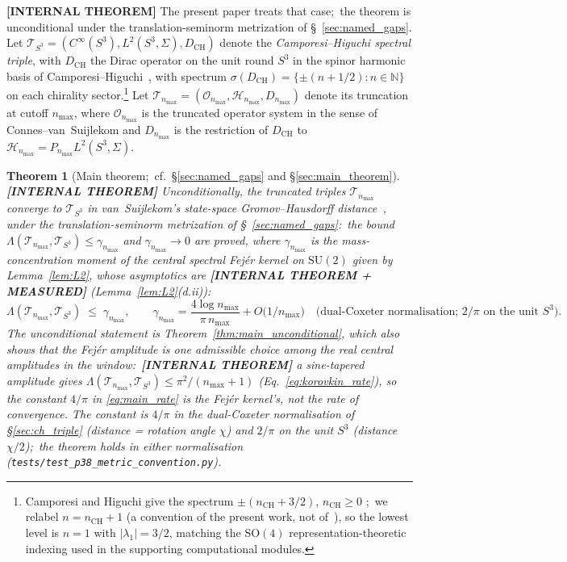 \documentclass[11pt,a4paper]{article}
\theoremstyle{plain}
\newtheorem{theorem}{Theorem}[section]
\theoremstyle{definition}
\newcommand{\nmax}{n_{\max}}
\newcommand{\sthree}{S^{3}}
\newcommand{\Hilb}{\mathcal{H}}
\newcommand{\Op}{\mathcal{O}}
\newcommand{\Tcal}{\mathcal{T}}
\newcommand{\N}{\mathbb{N}}
\newcommand{\SU}{\mathrm{SU}}
\newcommand{\SO}{\mathrm{SO}}
\newcommand{\DCH}{D_{\mathrm{CH}}}
\begin{document}
\textbf{[INTERNAL THEOREM]} The present paper treats that case;\ the
theorem is
unconditional under the translation-seminorm metrization of
\S~\ref{sec:named_gaps}. Let $\Tcal_{\sthree} =
(C^\infty(\sthree), L^2(\sthree, \Sigma), \DCH)$ denote the
\emph{Camporesi--Higuchi spectral triple}, with $\DCH$ the Dirac
operator on the unit round $\sthree$ in the spinor harmonic basis
of Camporesi--Higuchi~\cite{camporesi_higuchi1996}, with spectrum
$\sigma(\DCH) = \{\pm(n + 1/2) : n \in \N\}$ on each chirality
sector.\footnote{Camporesi and Higuchi give the spectrum
$\pm(n_{\mathrm{CH}} + 3/2)$, $n_{\mathrm{CH}} \ge 0$
\cite[\S3]{camporesi_higuchi1996};\ we relabel $n = n_{\mathrm{CH}} + 1$
(a convention of the present work, not of~\cite{camporesi_higuchi1996}),
so the lowest level is $n=1$ with $|\lambda_1| = 3/2$, matching the
$\SO(4)$ representation-theoretic indexing used in the supporting
computational modules.} Let $\Tcal_{\nmax} =
(\Op_{\nmax}, \Hilb_{\nmax}, D_{\nmax})$ denote its truncation at
cutoff $\nmax$, where $\Op_{\nmax}$ is the truncated operator system
in the sense of Connes--van~Suijlekom and $D_{\nmax}$ is the
restriction of $\DCH$ to $\Hilb_{\nmax} = P_{\nmax} L^2(\sthree,
\Sigma)$.

\begin{theorem}[Main theorem;\ cf.~\S\ref{sec:named_gaps} and
\S\ref{sec:main_theorem}]
\label{thm:main_intro}
\textbf{[INTERNAL THEOREM]}
Unconditionally, the truncated triples $\Tcal_{\nmax}$ converge to
$\Tcal_{\sthree}$ in van~Suijlekom's state-space Gromov--Hausdorff
distance~\cite{vs2021_jgp}, under the translation-seminorm
metrization of \S~\ref{sec:named_gaps}:\ the bound
$\Lambda(\Tcal_{\nmax}, \Tcal_{\sthree}) \le \gamma_{\nmax}$ and
$\gamma_{\nmax} \to 0$ are proved, where $\gamma_{\nmax}$ is the
mass-concentration moment of the central spectral Fej\'er kernel on
$\SU(2)$ given by Lemma~\ref{lem:L2}, whose asymptotics are
\textbf{[INTERNAL THEOREM + MEASURED]} (Lemma~\ref{lem:L2}(d.ii)):
\begin{equation}\label{eq:main_rate}
   \Lambda(\Tcal_{\nmax}, \Tcal_{\sthree})
   \;\le\; \gamma_{\nmax}, \qquad
   \gamma_{\nmax} = \frac{4 \log \nmax}{\pi\,\nmax} + O\!\bigl(1/\nmax\bigr)
   \quad\text{(dual-Coxeter normalisation; $2/\pi$ on the unit $\sthree$)}.
\end{equation}
The unconditional statement is
Theorem~\ref{thm:main_unconditional}, which also shows that the Fej\'er
amplitude is one admissible choice among the real central amplitudes in
the window:\ \textbf{[INTERNAL THEOREM]} a sine-tapered amplitude gives
$\Lambda(\Tcal_{\nmax}, \Tcal_{\sthree}) \le \pi^2/(\nmax+1)$
(Eq.~\eqref{eq:korovkin_rate}), so the constant
$4/\pi$ in \eqref{eq:main_rate} is the Fej\'er kernel's, not the rate of
convergence.  The constant is $4/\pi$ in the dual-Coxeter normalisation
of \S\ref{sec:ch_triple} (distance = rotation angle $\chi$) and $2/\pi$
on the unit $\sthree$ (distance $\chi/2$);\ the theorem holds in either
normalisation (\texttt{tests/test\_p38\_metric\_convention.py}).
\end{theorem}
\end{document}
